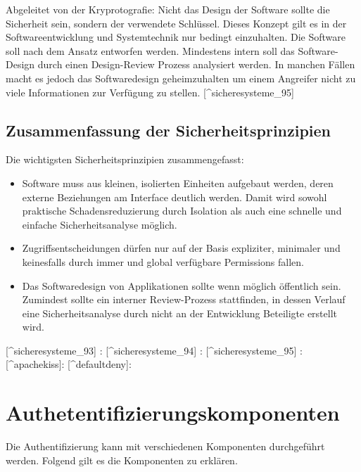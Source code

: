 Abgeleitet von der Kryprotografie: Nicht das Design der Software sollte
die Sicherheit sein, sondern der verwendete Schlüssel. Dieses Konzept
gilt es in der Softwareentwicklung und Systemtechnik nur bedingt
einzuhalten. Die Software soll nach dem Ansatz entworfen werden.
Mindestens intern soll das Software-Design durch einen Design-Review
Prozess analysiert werden. In manchen Fällen macht es jedoch das
Softwaredesign geheimzuhalten um einem Angreifer nicht zu viele
Informationen zur Verfügung zu stellen. {[}\^{}sicheresysteme\_95{]}

\subsection{Zusammenfassung der
Sicherheitsprinzipien}\label{zusammenfassung-der-sicherheitsprinzipien}

Die wichtigsten Sicherheitsprinzipien zusammengefasst:

\begin{itemize}
\tightlist
\item
  Software muss aus kleinen, isolierten Einheiten aufgebaut werden,
  deren externe Beziehungen am Interface deutlich werden. Damit wird
  sowohl praktische Schadensreduzierung durch Isolation als auch eine
  schnelle und einfache Sicherheitsanalyse möglich.
\item
  Zugriffsentscheidungen dürfen nur auf der Basis expliziter, minimaler
  und keinesfalls durch immer und global verfügbare Permissions fallen.
\item
  Das Softwaredesign von Applikationen sollte wenn möglich öffentlich
  sein. Zumindest sollte ein interner Review-Prozess stattfinden, in
  dessen Verlauf eine Sicherheitsanalyse durch nicht an der Entwicklung
  Beteiligte erstellt wird.
\end{itemize}

{[}\^{}sicheresysteme\_93{]} : \autocite[ pp.93]{sicheresysteme}
{[}\^{}sicheresysteme\_94{]} :\autocite[ pp.94]{sicheresysteme}
{[}\^{}sicheresysteme\_95{]} :\autocite[ pp.95]{sicheresysteme}
{[}\^{}apachekiss{]}: \autocite{apachekiss} {[}\^{}defaultdeny{]}:
\autocite{defaultdeny}

\section{Authetentifizierungskomponenten}\label{authetentifizierungskomponenten}

Die Authentifizierung kann mit verschiedenen Komponenten durchgeführt
werden. Folgend gilt es die Komponenten zu erklären.

